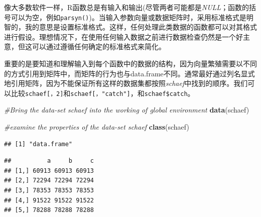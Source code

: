 \documentclass[
  lang=cn,
  11pt,
  scheme=chinese,
  chinesefont=nofont,
  citestyle=gb7714-2015,
  bibstyle=gb7714-2015]{elegantbook}
\newenvironment{Shaded}{\begin{snugshade}}{\end{snugshade}}
\newcommand{\CommentTok}[1]{\textcolor[rgb]{0.56,0.35,0.01}{\textit{#1}}}
\newcommand{\DecValTok}[1]{\textcolor[rgb]{0.00,0.00,0.81}{#1}}
\newcommand{\FunctionTok}[1]{\textcolor[rgb]{0.13,0.29,0.53}{\textbf{#1}}}
\newcommand{\NormalTok}[1]{#1}
\newcommand{\OtherTok}[1]{\textcolor[rgb]{0.56,0.35,0.01}{#1}}
\newcommand{\SpecialCharTok}[1]{\textcolor[rgb]{0.81,0.36,0.00}{\textbf{#1}}}
\newcommand{\StringTok}[1]{\textcolor[rgb]{0.31,0.60,0.02}{#1}}
\begin{document}
像大多数软件一样，R函数总是有输入和输出(尽管两者可能都是\emph{NULL}；函数的括号可以为空，例如\texttt{parsyn()})。当输入参数向量或数据矩阵时，采用标准格式是明智的，我的意思是设置标准格式。这样，任何处理此类数据的函数都可以对其格式进行假设。理想情况下，在使用任何输入数据之前进行数据检查仍然是一个好主意，但这可以通过遵循任何确定的标准格式来简化。

重要的是要知道和理解输入到每个函数中的数据的结构，因为向量繁殖需要以不同的方式引用到矩阵中，而矩阵的行为也与data.frame不同。通常最好通过列名显式地引用矩阵，因为不能保证所有这样的数据集都按照\emph{schaef}中找到的顺序。我们可以比较\texttt{schaef{[}，2{]}}和\texttt{schaef{[}，"catch"{]}}，和\texttt{schaef\$catch}。

\begin{Shaded}
\begin{Highlighting}[]
 \CommentTok{\#Bring the data{-}set schaef into the working of global environment  }
\FunctionTok{data}\NormalTok{(schaef)  }
\end{Highlighting}
\end{Shaded}

\begin{Shaded}
\begin{Highlighting}[]
 \CommentTok{\#examine the properties of the data{-}set schaef  }
\FunctionTok{class}\NormalTok{(schaef)  }
\end{Highlighting}
\end{Shaded}

\begin{verbatim}
## [1] "data.frame"
\end{verbatim}

\begin{Shaded}
\end{Shaded}

\begin{verbatim}
##          a     b     c
## [1,] 60913 60913 60913
## [2,] 72294 72294 72294
## [3,] 78353 78353 78353
## [4,] 91522 91522 91522
## [5,] 78288 78288 78288
\end{verbatim}
\end{document}

